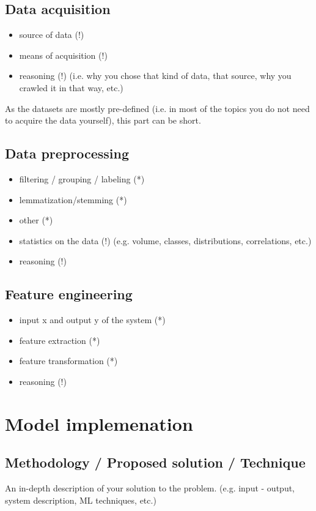 \documentclass[sigconf]{acmart}
\begin{document}
\subsection{Data acquisition}
\begin{itemize}
 \item source of data (!)
 \item means of acquisition (!)
 \item reasoning (!) (i.e. why you chose that kind of data, that source, why you crawled it in that way, etc.)
\end{itemize}
As the datasets are mostly pre-defined (i.e. in most of the topics you do not need to acquire the data yourself), this part can be short.

\subsection{Data preprocessing}
\begin{itemize}
 \item filtering / grouping / labeling (*)
 \item lemmatization/stemming (*)
 \item other (*)
 \item statistics on the data (!) (e.g. volume, classes, distributions, correlations, etc.)
 \item reasoning (!)
\end{itemize}

\subsection{Feature engineering}
\begin{itemize}
 \item input x and output y of the system (*)
 \item feature extraction (*)
 \item feature transformation (*)
 \item reasoning (!)
\end{itemize}



\section{Model implemenation}
\subsection{Methodology / Proposed solution / Technique}
An in-depth description of your solution to the problem. (e.g. input - output, system description, ML techniques, etc.)
\end{document}
